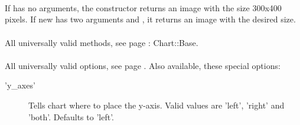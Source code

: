 \\
\\
\\
If  has no arguments, the constructor returns an image with the size 300x400 pixels. If new has two arguments  and , it returns an image with the desired size. \\ 
\\ 
All universally valid methods, see page \pageref{methods}: Chart::Base. \\
\\
 All universally valid options, see page \pageref{options}. Also available, these special options:
\begin{description}
\item['y\_axes'] Tells chart where to place the y-axis. Valid values are 'left', 'right' and 'both'. Defaults to 'left'.
\end{description}
